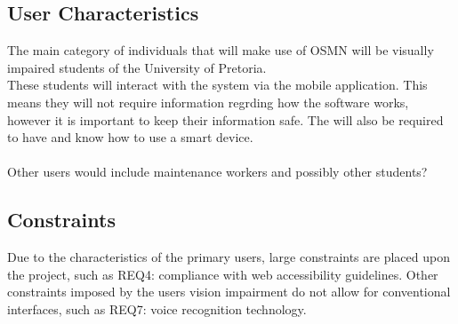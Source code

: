 \documentclass{article}
\begin{document}
			
	
	\subsection{User Characteristics}
		The main category of individuals that will make use of OSMN will be visually impaired students of the University of Pretoria.\\
		These students will interact with the system via the mobile application. This means they will not require information regrding how the software works, however it is important to keep their information safe. The will also be required to have and know how to use a smart device.\\ \\
		
		Other users would include maintenance workers and possibly other students? %
	
	
	
	\subsection{Constraints}
		Due to the characteristics of the primary users, large constraints are placed upon the project, such as REQ4: compliance with web accessibility guidelines.
		Other constraints imposed by the users vision impairment do not allow for conventional interfaces, such as REQ7: voice recognition technology.
	
	
	
\end{document}
